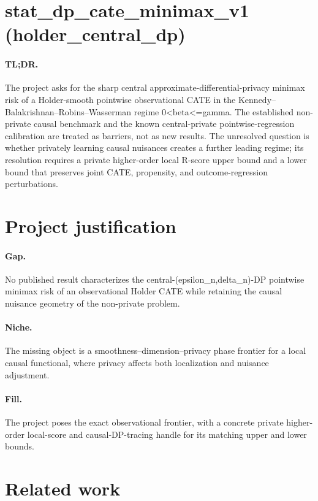 \documentclass{article}
\begin{document}
\section*{stat_dp_cate_minimax_v1 (holder_central_dp)}

\paragraph{TL;DR.} The project asks for the sharp central approximate-differential-privacy minimax risk of a Holder-smooth pointwise observational CATE in the Kennedy--Balakrishnan--Robins--Wasserman regime 0<beta<=gamma. The established non-private causal benchmark and the known central-private pointwise-regression calibration are treated as barriers, not as new results. The unresolved question is whether privately learning causal nuisances creates a further leading regime; its resolution requires a private higher-order local R-score upper bound and a lower bound that preserves joint CATE, propensity, and outcome-regression perturbations.

\section{Project justification}

\paragraph{Gap.} No published result characterizes the central-(epsilon_n,delta_n)-DP pointwise minimax risk of an observational Holder CATE while retaining the causal nuisance geometry of the non-private problem.

\paragraph{Niche.} The missing object is a smoothness--dimension--privacy phase frontier for a local causal functional, where privacy affects both localization and nuisance adjustment.

\paragraph{Fill.} The project poses the exact observational frontier, with a concrete private higher-order local-score and causal-DP-tracing handle for its matching upper and lower bounds.

\section{Related work}
\end{document}
